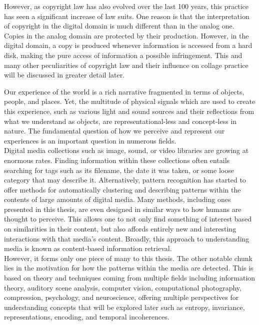 \documentclass[a4paper,11pt,twoside]{ThesisStyle}
\begin{document}
However, as copyright law has also evolved over the last 100 years, this practice has seen a significant increase of law suits.  One reason is that the interpretation of copyright in the digital domain is much different than in the analog one.  Copies in the analog domain are protected by their production.  However, in the digital domain, a copy is produced whenever information is accessed from a hard disk, making the pure access of information a possible infringement.  This and many other peculiarities of copyright law and their influence on collage practice will be discussed in greater detail later.  


Our experience of the world is a rich narrative fragmented in terms of objects, people, and places.  Yet, the multitude of physical signals which are used to create this experience, such as various light and sound sources and their reflections from what we understand as objects, are representational-less and concept-less in nature.  The fundamental question of how we perceive and represent our experiences is an important question in numerous fields.
\\
Digital media collections such as image, sound, or video libraries are growing at enormous rates.  Finding information within these collections often entails searching for tags such as its filename, the date it was taken, or some loose category that may describe it.  Alternatively, pattern recognition has started to offer methods for automatically clustering and describing patterns within the contents of large amounts of digital media.  Many methods, including ones presented in this thesis, are even designed in similar ways to how humans are thought to perceive.  This allows one to not only find something of interest based on similarities in their content, but also affords entirely new and interesting interactions with that media's content.  Broadly, this approach to understanding media is known as content-based information retrieval.  
\\
However, it forms only one piece of many to this thesis.  The other notable chunk lies in the motivation for how the patterns within the media are detected.  This is based on theory and techniques coming from multiple fields including information theory, auditory scene analysis, computer vision, computational photography, compression, psychology, and neuroscience, offering multiple perspectives for understanding concepts that will be explored later such as entropy, invariance, representations, encoding, and temporal incoherences.  
\\
\end{document}

